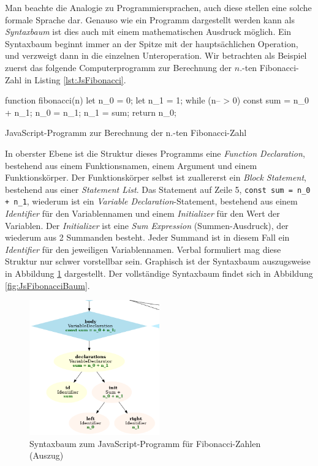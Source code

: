 Man beachte die Analogie zu Programmiersprachen, auch diese stellen eine solche formale Sprache dar. Genauso wie ein Programm dargestellt werden kann als \emph{Syntaxbaum} ist dies auch mit einem mathematischen Ausdruck möglich. Ein Syntaxbaum beginnt immer an der Spitze mit der hauptsächlichen Operation, und verzweigt dann in die einzelnen Unteroperation. Wir betrachten als Beispiel zuerst das folgende Computerprogramm zur Berechnung der $n$.-ten Fibonacci-Zahl in Listing \ref{lst:JsFibonacci}.

\begin{listing}
\begin{jscode}
function fibonacci(n) {
	let n_0 = 0;
	let n_1 = 1;
	while (n-- > 0) {
		const sum = n_0 + n_1;
		n_0 = n_1;
		n_1 = sum;
	}
	return n_0;
}
\end{jscode}
\caption{JavaScript-Programm zur Berechnung der n.-ten Fibonacci-Zahl}
\label{lst:JsFibonacci}
\end{listing}


In oberster Ebene ist die Struktur dieses Programms eine \emph{Function Declaration}, bestehend aus einem Funktionsnamen, einem Argument und einem Funktionskörper. Der Funktionskörper selbst ist zuallererst ein \emph{Block Statement}, bestehend aus einer \emph{Statement List}. Das Statement auf Zeile 5, \lstinline{const sum = n_0 + n_1}, wiederum ist ein \emph{Variable Declaration}-Statement, bestehend aus einem \emph{Identifier} für den Variablennamen und einem \emph{Initializer} für den Wert der Variablen. Der \emph{Initializer} ist eine \emph{Sum Expression} (Summen-Ausdruck), der wiederum aus 2 Summanden besteht. Jeder Summand ist in diesem Fall ein \emph{Identifier} für den jeweiligen Variablennamen. Verbal formuliert mag diese Struktur nur schwer vorstellbar sein. Graphisch ist der Syntaxbaum auszugsweise in Abbildung \ref{fig:JsFibonacciBaumPart} dargestellt. Der vollständige Syntaxbaum findet sich in Abbildung \ref{fig:JsFibonacciBaum}.

\begin{figure}
	\centering
	\includegraphics[width=0.5\textwidth]{./img/js-tree-fibonacci-part.png}
	\caption{Syntaxbaum zum JavaScript-Programm für Fibonacci-Zahlen (Auszug)}
	\label{fig:JsFibonacciBaumPart}
\end{figure}

